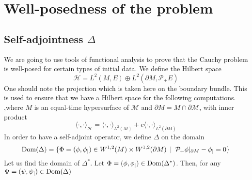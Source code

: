 \section{Well-posedness of the problem}\label{wen-sect-saw}
\subsection{Self-adjointness $\Delta$}
We are going to use tools of functional analysis to prove that the Cauchy problem is well-posed for certain types of initial data.
We define the Hilbert space 
\begin{equation*}
\mathcal{H} = L^{2}(M,E)\oplus L^{2}(\partial M, \mathcal{P}_+ E)
\end{equation*}
One should note the projection which is taken here on the boundary bundle.
This is used to ensure that we have a Hilbert space for the following computations.
,where $M$ is an equal-time hypersurface of $\mathcal{M}$ and $\partial M = M\cap \partial \mathcal{M}$,
with inner product
\begin{equation}\label{wen-innerpdt}
\langle \cdot, \cdot \rangle _\mathcal{H} = \langle \cdot, \cdot \rangle _{L^2(M)} + c \langle \cdot, \cdot \rangle _{L^2(\partial M)}
\end{equation}
In order to have a self-adjoint operator, we define $\Delta$ on the domain
\begin{equation*}
\mathrm{Dom}( \Delta) = \{ \Phi = (\phi, \phi_|) \in W^{1,2}(M)\times W^{1,2}(
\partial M)\enskip | \enskip \mathcal{P}_+\phi \vert_{\partial M} - \phi_| = 0 \}
\end{equation*}
Let us find the domain of $\Delta^*$.  
Let $\Phi = (\phi, \phi_|) \in \mathrm{Dom}(\Delta^*)$.
Then, for any $ \Psi = (\psi, \psi_|)\in\mathrm{Dom}(\Delta)$
